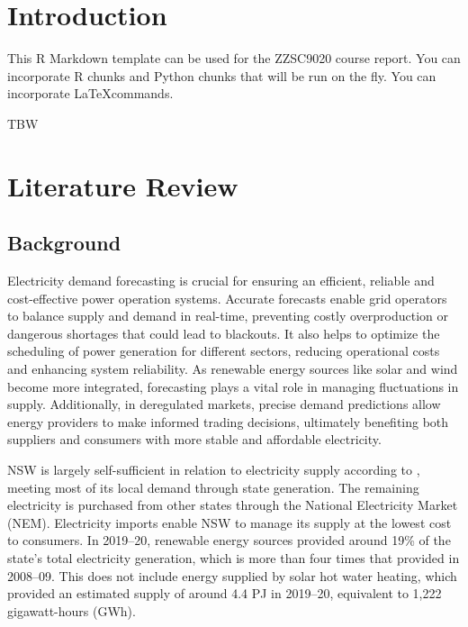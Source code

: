 \documentclass[mstat,12pt]{unswthesis}
\begin{document}
%
%






\chapter{Introduction}\label{introduction}

This R Markdown template can be used for the ZZSC9020 course report. You
can incorporate R \cite{R} chunks and Python chunks that will be run on
the fly. You can incorporate \LaTeX commands.

\bigskip

TBW

\chapter{Literature Review}\label{literature-review}

\section{Background}\label{background}

Electricity demand forecasting is crucial for ensuring an efficient,
reliable and cost-effective power operation systems. Accurate forecasts
enable grid operators to balance supply and demand in real-time,
preventing costly overproduction or dangerous shortages that could lead
to blackouts. It also helps to optimize the scheduling of power
generation for different sectors, reducing operational costs and
enhancing system reliability. As renewable energy sources like solar and
wind become more integrated, forecasting plays a vital role in managing
fluctuations in supply. Additionally, in deregulated markets, precise
demand predictions allow energy providers to make informed trading
decisions, ultimately benefiting both suppliers and consumers with more
stable and affordable electricity.

NSW is largely self-sufficient in relation to electricity supply
according to \cite{nswEnergyConsumption2021}, meeting most of its local
demand through state generation. The remaining electricity is purchased
from other states through the National Electricity Market (NEM).
Electricity imports enable NSW to manage its supply at the lowest cost
to consumers. In 2019--20, renewable energy sources provided around 19\%
of the state's total electricity generation, which is more than four
times that provided in 2008--09. This does not include energy supplied
by solar hot water heating, which provided an estimated supply of around
4.4 PJ in 2019--20, equivalent to 1,222 gigawatt-hours (GWh).
\end{document}
